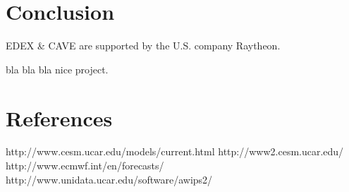 \documentclass[]{article}
\begin{document}
\section{Conclusion}\label{conclusion}

EDEX \& CAVE are supported by the U.S. company Raytheon.

bla bla bla nice project.

\section{References}\label{references}

http://www.cesm.ucar.edu/models/current.html http://www2.cesm.ucar.edu/
http://www.ecmwf.int/en/forecasts/
http://www.unidata.ucar.edu/software/awips2/
\end{document}
